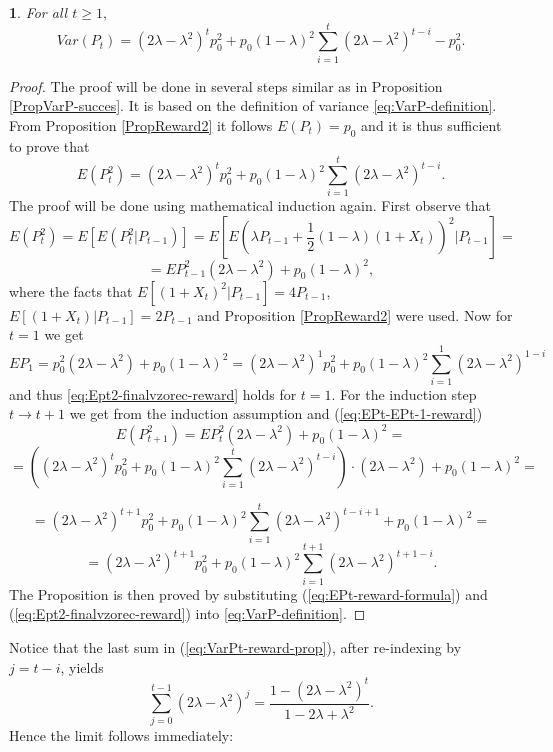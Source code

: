 \documentclass{amsart}
\theoremstyle{definition}
\theoremstyle{plain}
\newtheorem{prop}[thm]{\protect\propositionname}
\theoremstyle{plain}
\theoremstyle{plain}
\numberwithin{equation}{section}
\providecommand{\propositionname}{Proposition}
\begin{document}
    \begin{prop}
        For all $t\geq1,$
        \begin{equation}
            Var(P_{t})=(2\lambda-\lambda^{2})^{t}p_{0}^{2}+p_{0}(1-\lambda)^{2}\sum_{i=1}^{t}(2\lambda-\lambda^{2})^{t-i}-p_{0}^{2}.\label{eq:VarPt-reward-prop}
        \end{equation}
    \end{prop}
    \begin{proof}
        The proof will be done in several steps similar as in Proposition
        \ref{PropVarP-succes}. It is based on the definition of variance \eqref{eq:VarP-definition}. From Proposition \ref{PropReward2} it follows $E(P_{t})=p_{0}$ and
        it is thus sufficient to prove that
        \begin{equation}
            E(P_{t}^{2})=(2\lambda-\lambda^{2})^{t}p_{0}^{2}+p_{0}(1-\lambda)^{2}\sum_{i=1}^{t}(2\lambda-\lambda^{2})^{t-i}.\label{eq:Ept2-finalvzorec-reward}
        \end{equation}
        The proof will be done using mathematical induction again. First observe that
        \[
            E(P_{t}^{2})=E[E(P_{t}^{2}|P_{t-1})]=E[E(\lambda P_{t-1}+\frac{1}{2}(1-\lambda)(1+X_{t}))^{2}|P_{t-1}]=
        \]
        \begin{equation}
            =EP_{t-1}^{2}(2\lambda-\lambda^{2})+p_{0}(1-\lambda)^{2},\label{eq:EPt-EPt-1-reward}
        \end{equation}
        where the facts that $E[(1+X_{t})^{2}|P_{t-1}]=4P_{t-1}$, $E[(1+X_{t})|P_{t-1}]=2P_{t-1}$
        and Proposition \ref{PropReward2} were used. Now for $t=1$ we get
        \[
            EP_{1}=p_{0}^{2}(2\lambda-\lambda^{2})+p_{0}(1-\lambda)^{2}=(2\lambda-\lambda^{2})^{1}p_{0}^{2}+p_{0}(1-\lambda)^{2}\sum_{i=1}^{1}(2\lambda-\lambda^{2})^{1-i}
        \]
        and thus \eqref{eq:Ept2-finalvzorec-reward} holds for $t=1$. For the induction step $t\rightarrow t+1$
        we get from the induction assumption and (\ref{eq:EPt-EPt-1-reward})
        \[
            E(P_{t+1}^{2})=EP_{t}^{2}(2\lambda-\lambda^{2})+p_{0}(1-\lambda)^{2}=
        \]
        \[
            =((2\lambda-\lambda^{2})^{t}p_{0}^{2}+p_{0}(1-\lambda)^{2}\sum_{i=1}^{t}(2\lambda-\lambda^{2})^{t-i})\cdot(2\lambda-\lambda^{2})+p_{0}(1-\lambda)^{2}=
        \]

        \[
            =(2\lambda-\lambda^{2})^{t+1}p_{0}^{2}+p_{0}(1-\lambda)^{2}\sum_{i=1}^{t}(2\lambda-\lambda^{2})^{t-i+1}+p_{0}(1-\lambda)^{2}=
        \]
        \[
            =(2\lambda-\lambda^{2})^{t+1}p_{0}^{2}+p_{0}(1-\lambda)^{2}\sum_{i=1}^{t+1}(2\lambda-\lambda^{2})^{t+1-i}.
        \]
        The Proposition is then proved by substituting (\ref{eq:EPt-reward-formula})
        and (\ref{eq:Ept2-finalvzorec-reward}) into \eqref{eq:VarP-definition}.
    \end{proof}
    Notice that the last sum in (\ref{eq:VarPt-reward-prop}), after re-indexing
    by $j=t-i$, yields
    \[
        \sum_{j=0}^{t-1}(2\lambda-\lambda^{2})^{j}=\frac{1-(2\lambda-\lambda^{2})^{t}}{1-2\lambda+\lambda^{2}}.
    \]
    Hence the limit follows immediately:
\end{document}
